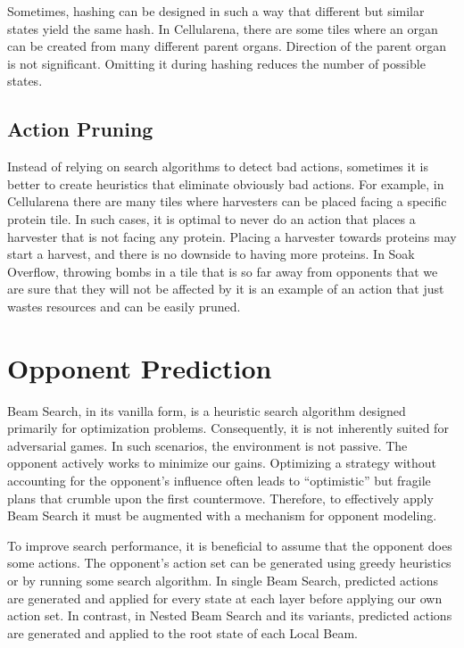 \documentclass[shortabstract, mgr, english]{iithesis}
\begin{document}
Sometimes, hashing can be designed in such a way that different but similar states yield the same hash. In Cellularena, there are some tiles where an organ can be created from many different parent organs. Direction of the parent organ is not significant. Omitting it during hashing reduces the number of possible states.

\section{Action Pruning}
Instead of relying on search algorithms to detect bad actions, sometimes it is better to create heuristics that eliminate obviously bad actions. For example, in Cellularena there are many tiles where harvesters can be placed facing a specific protein tile. In such cases, it is optimal to never do an action that places a harvester that is not facing any protein. Placing a harvester towards proteins may start a harvest, and there is no downside to having more proteins. In Soak Overflow, throwing bombs in a tile that is so far away from opponents that we are sure that they will not be affected by it is an example of an action that just wastes resources and can be easily pruned.




\chapter{Opponent Prediction}
\label{chapter:OpponentPrediction}
Beam Search, in its vanilla form, is a heuristic search algorithm designed primarily for optimization problems. Consequently, it is not inherently suited for adversarial games. In such scenarios, the environment is not passive. The opponent actively works to minimize our gains. Optimizing a strategy without accounting for the opponent's influence often leads to ``optimistic'' but fragile plans that crumble upon the first countermove. Therefore, to effectively apply Beam Search it must be augmented with a mechanism for opponent modeling.

To improve search performance, it is beneficial to assume that the opponent does some actions. The opponent's action set can be generated using greedy heuristics or by running some search algorithm. In single Beam Search, predicted actions are generated and applied for every state at each layer before applying our own action set. In contrast, in Nested Beam Search and its variants, predicted actions are generated and applied to the root state of each Local Beam.
\end{document}
